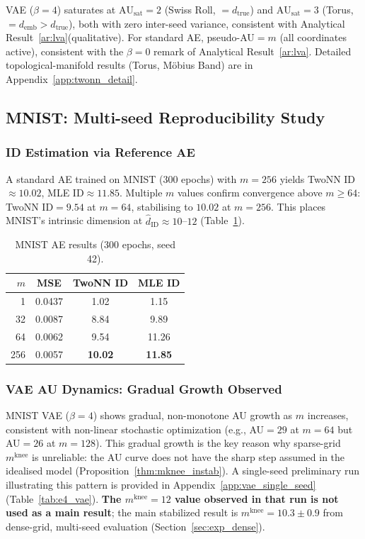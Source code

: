 \documentclass[make,article,submit,pdftex,moreauthors]{Definitions/mdpi}
\newcommand{\AUsat}{\mathrm{AU}_{\mathrm{sat}}}
\newcommand{\mknee}{m^{\mathrm{knee}}}
\newcommand{\hatdID}{\hat{d}_{\mathrm{ID}}}
\begin{document}
VAE ($\beta=4$) saturates at $\AUsat=2$ (Swiss Roll, $=d_{\mathrm{true}}$) and
$\AUsat=3$ (Torus, $=d_{\mathrm{emb}}>d_{\mathrm{true}}$), both with zero
inter-seed variance, consistent with Analytical Result~\ref{ar:lva}(qualitative).
For standard AE, pseudo-AU$=m$ (all coordinates active), consistent with
the $\beta=0$ remark of Analytical Result~\ref{ar:lva}.
Detailed topological-manifold results (Torus, Möbius Band) are in
Appendix~\ref{app:twonn_detail}.

\subsection{MNIST: Multi-seed Reproducibility Study}\label{sec:exp_mnist}

\subsubsection{ID Estimation via Reference AE}

A standard AE trained on MNIST (300 epochs) with $m=256$ yields
TwoNN ID$\approx10.02$, MLE ID$\approx11.85$.
Multiple $m$ values confirm convergence above $m\geq64$:
TwoNN ID$=9.54$ at $m=64$, stabilising to $10.02$ at $m=256$.
This places MNIST's intrinsic dimension at $\hatdID\approx10$--$12$
(Table~\ref{tab:e4_ae}).

\begin{table}[ht]
\centering
\caption{MNIST AE results (300 epochs, seed 42).}
\label{tab:e4_ae}
\small
\begin{tabular}{rccc}
\toprule
$m$ & MSE & TwoNN ID & MLE ID \\
\midrule
1   & 0.0437 & 1.02  & 1.15  \\
32  & 0.0087 & 8.84  & 9.89  \\
64  & 0.0062 & 9.54  & 11.26 \\
256 & 0.0057 & \textbf{10.02} & \textbf{11.85} \\
\bottomrule
\end{tabular}
\end{table}

\subsubsection{VAE AU Dynamics: Gradual Growth Observed}
\label{sec:vae_au_dynamics}

MNIST VAE ($\beta=4$) shows gradual, non-monotone AU growth as $m$ increases,
consistent with non-linear stochastic optimization (e.g., AU$=29$ at $m=64$
but AU$=26$ at $m=128$).
This gradual growth is the key reason why sparse-grid $\mknee$ is unreliable:
the AU curve does not have the sharp step assumed in the idealised model
(Proposition~\ref{thm:mknee_instab}).
A single-seed preliminary run illustrating this pattern is provided in
Appendix~\ref{app:vae_single_seed} (Table~\ref{tab:e4_vae}).
\textbf{The $\mknee=12$ value observed in that run is not used as a main
result}; the main stabilized result is $\mknee=10.3\pm0.9$ from dense-grid,
multi-seed evaluation (Section~\ref{sec:exp_dense}).
\end{document}
